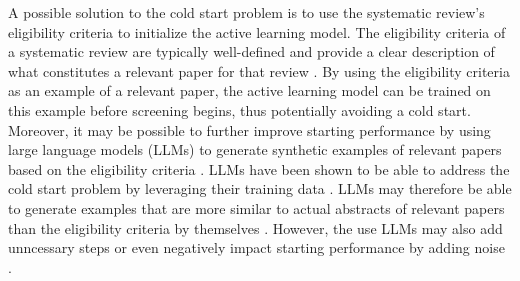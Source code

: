 \documentclass[12pt]{article}
\begin{document}

A possible solution to the cold start problem is to use the systematic review's eligibility criteria to initialize the active learning model. The eligibility criteria of a systematic review are typically well-defined and provide a clear description of what constitutes a relevant paper for that review \parencite{cochraneChapterDefining}. By using the eligibility criteria as an example of a relevant paper, the active learning model can be trained on this example before screening begins, thus potentially avoiding a cold start. Moreover, it may be possible to further improve starting performance by using large language models (LLMs) to generate synthetic examples of relevant papers based on the eligibility criteria \parencite{riegler2025using}. LLMs have been shown to be able to address the cold start problem by leveraging their training data \parencite{zhang2023cold, zhang2025cold, xia2025selection, bayer2024activellm, bachmann2025adaptive}. LLMs may therefore be able to generate examples that are more similar to actual abstracts of relevant papers than the eligibility criteria by themselves \parencite{steyvers2025large}. However, the use LLMs may also add unncessary steps or even negatively impact starting performance by adding noise \parencite{gartlehner2025responsible, sollini2025human}.
\end{document}
